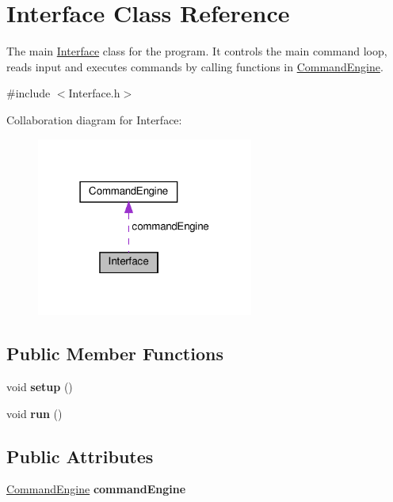 \hypertarget{classInterface}{}\section{Interface Class Reference}
\label{classInterface}


The main \hyperlink{classInterface}{Interface} class for the program. It controls the main command loop, reads input and executes commands by calling functions in \hyperlink{classCommandEngine}{Command\+Engine}.  




{\ttfamily \#include $<$Interface.\+h$>$}



Collaboration diagram for Interface\+:\nopagebreak
\begin{figure}[H]
\begin{center}
\leavevmode
\includegraphics[width=202pt]{classInterface__coll__graph}
\end{center}
\end{figure}
\subsection*{Public Member Functions}
\begin{DoxyCompactItemize}
\item 
\mbox{\label{classInterface_a90eb0675e0534a93b6486065da5168a9}} 
void {\bfseries setup} ()
\item 
\mbox{\label{classInterface_a090a950300a463d91f8f361d3b333906}} 
void {\bfseries run} ()
\end{DoxyCompactItemize}
\subsection*{Public Attributes}
\begin{DoxyCompactItemize}
\item 
\mbox{\label{classInterface_a5a2c86a63a352460d715f580568aabad}} 
\hyperlink{classCommandEngine}{Command\+Engine} {\bfseries command\+Engine}
\end{DoxyCompactItemize}


